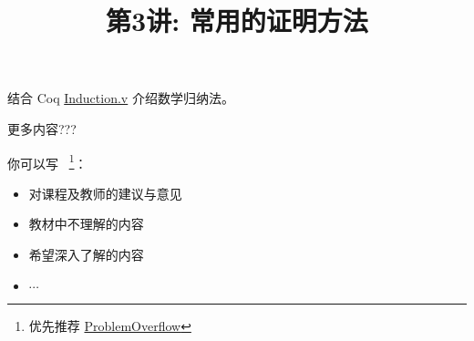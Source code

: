 \documentclass[a4paper, justified]{tufte-handout}
\title{第3讲: 常用的证明方法}
\date{\zhtoday} %
\begin{document}
\maketitle
\noplagiarism %
\begin{abstract}
  \begin{center}{}
  \end{center}
\end{abstract}
\beginrequired

\begin{problem}[]
\end{problem}

\begin{solution}
\end{solution}

\beginoptional

\begin{problem}[]
\end{problem}

\begin{solution}
\end{solution}

\beginot

\begin{ot}[Coq]
  结合 Coq \href{https://github.com/hengxin/problem-solving-class-coq/blob/master/2019-1-coq/Induction.v}{Induction.v}
  介绍数学归纳法。

  更多内容???
\end{ot}

\begin{solution}
\end{solution}

\begin{ot}[]
\end{ot}

\begin{solution}
\end{solution}

\begincorrection

\beginfb

你可以写
~\footnote{优先推荐 \href{problemoverflow.top}{ProblemOverflow}}：
\begin{itemize}
  \item 对课程及教师的建议与意见
  \item 教材中不理解的内容
  \item 希望深入了解的内容
  \item $\cdots$
\end{itemize}
\end{document}
